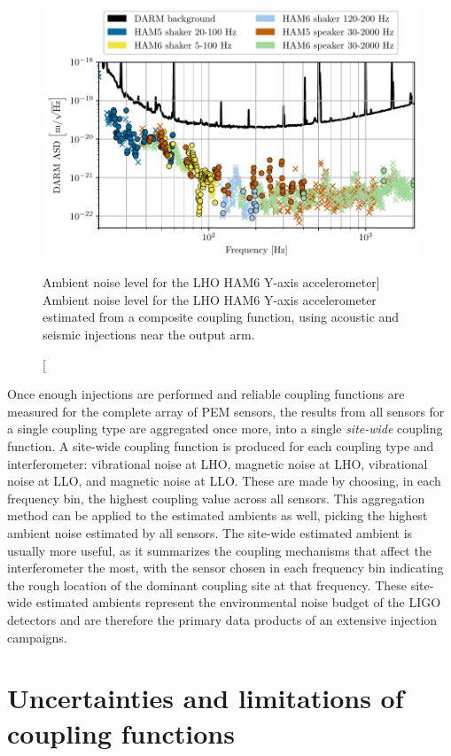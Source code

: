 \begin{figure}[h!]
	\centering
	\includegraphics{figures/noise-methods/cf-composite.pdf}
	\caption
	[Ambient noise level for the LHO HAM6 Y-axis accelerometer]
	{
		Ambient noise level for the LHO HAM6 Y-axis accelerometer estimated from a composite coupling function, using acoustic and seismic injections near the output arm.
		}
	\label{fig:cf-composite}
\end{figure}

Once enough injections are performed and reliable coupling functions are measured for the complete array of PEM sensors, the results from all sensors for a single coupling type are aggregated once more, into a single \textit{site-wide} coupling function.
A site-wide coupling function is produced for each coupling type and interferometer: vibrational noise at LHO, magnetic noise at LHO, vibrational noise at LLO, and magnetic noise at LLO.
These are made by choosing, in each frequency bin, the highest coupling value across all sensors.
This aggregation method can be applied to the estimated ambients as well, picking the highest ambient noise estimated by all sensors.
The site-wide estimated ambient is usually more useful, as it summarizes the coupling mechanisms that affect the interferometer the most, with the sensor chosen in each frequency bin indicating the rough location of the dominant coupling site at that frequency.
These site-wide estimated ambients represent the environmental noise budget of the LIGO detectors and are therefore the primary data products of an extensive injection campaigns.


\section{Uncertainties and limitations of coupling functions}\label{sec:uncertainties}


